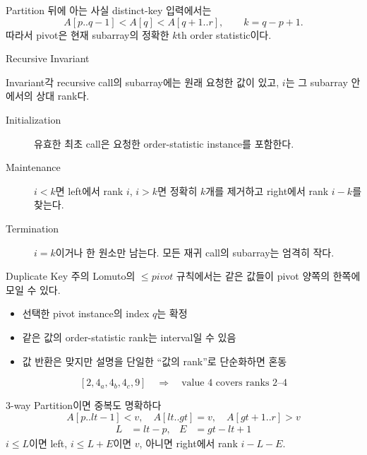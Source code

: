 \begin{frame}{Partition 뒤에 아는 사실}
distinct-key 입력에서는
\[A[p..q-1]<A[q]<A[q+1..r],\qquad k=q-p+1.\]
따라서 pivot은 현재 subarray의 정확한 $k$th order statistic이다.
\vfill{}
\end{frame}
\begin{frame}{Recursive Invariant}
\begin{block}{Invariant}각 recursive call의 subarray에는 원래 요청한 값이 있고, $i$는 그 subarray 안에서의 상대 rank다.\end{block}
\begin{description}
\item[Initialization]유효한 최초 call은 요청한 order-statistic instance를 포함한다.
\item[Maintenance]$i<k$면 left에서 rank $i$, $i>k$면 정확히 $k$개를 제거하고 right에서 rank $i-k$를 찾는다.
\item[Termination]$i=k$이거나 한 원소만 남는다. 모든 재귀 call의 subarray는 엄격히 작다.
\end{description}
\vfill{}
\end{frame}
\begin{frame}{Duplicate Key 주의}
Lomuto의 $\le pivot$ 규칙에서는 같은 값들이 pivot 양쪽의 한쪽에 모일 수 있다.
\begin{itemize}\item 선택한 pivot instance의 index $q$는 확정\item 같은 값의 order-statistic rank는 interval일 수 있음\item 값 반환은 맞지만 설명을 단일한 “값의 rank”로 단순화하면 혼동\end{itemize}
\[
[2,4_a,4_b,4_c,9]\quad\Longrightarrow\quad
\text{value }4\text{ covers ranks }2\text{--}4
\]
\end{frame}
\begin{frame}{3-way Partition이면 중복도 명확하다}
\[A[p..lt-1]<v,\quad A[lt..gt]=v,\quad A[gt+1..r]>v\]
\begin{align*}L&=lt-p, & E&=gt-lt+1\end{align*}
$i\le L$이면 left, $i\le L+E$이면 $v$, 아니면 right에서 rank $i-L-E$.
\vfill{}
\end{frame}

